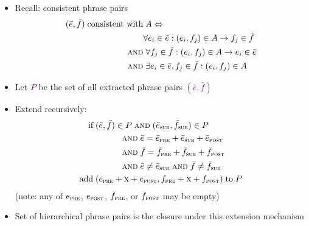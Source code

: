 \documentclass[landscape]{slides}
\newcommand{\maths}[1]{\textcolor{purple}{#1}}
\begin{document}
\begin{itemize}\vspace{15mm}
\item Recall: consistent phrase pairs
\maths{\begin{equation*}
\begin{split}
( \bar{e} , \bar{f} ) \; \mbox{consistent with} & \; A \Leftrightarrow \\
 & \forall e_i \in \bar{e}: (e_i,f_j) \in A \rightarrow f_j \in \bar{f} \\
 \mbox{\sc and} & \; \forall f_j \in \bar{f}: (e_i,f_j) \in A \rightarrow e_i  \in \bar{e} \\
 \mbox{\sc and} & \; \exists e_i \in \bar{e}, f_j \in \bar{f}: (e_i,f_j) \in A
\end{split}
\end{equation*}}
\item Let \maths{$P$} be the set of all extracted phrase pairs \maths{$( \bar{e} , \bar{f} )$}
\end{itemize}


\begin{itemize}\vspace{10mm}
\item Extend recursively:
\maths{\begin{equation*}
\begin{split}
\text{if}\; & ( \bar{e} , \bar{f} ) \in P \;\mbox{\sc and}\; ( \bar{e}_\text{\sc sub} , \bar{f}_\text{\sc sub} ) \in P \\
& \phantom{.} \hspace{1cm} \mbox{\sc and}\; \bar{e} = \bar{e}_\text{\sc pre}+\bar{e}_\text{\sc sub}+\bar{e}_\text{\sc post} \\
& \phantom{.} \hspace{1cm} \mbox{\sc and}\; \bar{f} = \bar{f}_\text{\sc pre}+\bar{f}_\text{\sc sub}+\bar{f}_\text{\sc post} \\
& \phantom{.} \hspace{1cm} \mbox{\sc and}\; \bar{e} \ne \bar{e}_\text{\sc sub} \;\text{\sc and}\; \bar{f} \ne \bar{f}_\text{\sc sub} \\
\text{add}\; & (e_\text{\sc pre}+\text{\sc x}+e_\text{\sc post},f_\text{\sc pre}+\text{\sc x}+f_\text{\sc post}) \;\text{to}\; P
\end{split}
\end{equation*}}
(note: any of \maths{$e_\text{\sc pre}$}, \maths{$e_\text{\sc post}$}, \maths{$f_\text{\sc pre}$}, or \maths{$f_\text{\sc post}$} may be empty)
\item Set of hierarchical phrase pairs is the closure under this extension mechanism
\end{itemize}
\end{document}
